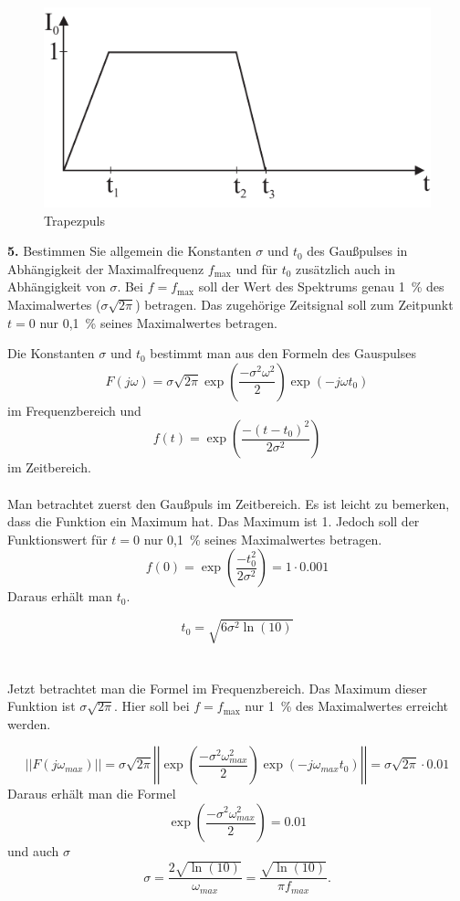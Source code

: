 \documentclass[Protokollheft.tex]{subfiles}
\begin{document}
\begin{figure}[ht]
	\centering
    \includegraphics[scale=0.9]{v7_trapez.pdf}
    \caption{Trapezpuls}\label{tra}
\end{figure}

\begin{framed}
	\noindent \textbf{5.} Bestimmen Sie allgemein die Konstanten $\sigma$ und $t_0$
des Gaußpulses in Abhängigkeit der Maximalfrequenz $f_{\text{max}}$ 
und für $t_0$ zusätzlich auch in Abhängigkeit von $\sigma$. Bei
$f=f_{\text{max}}$ soll der Wert des Spektrums genau 1~\% des
Maximalwertes ($\sigma\sqrt{2\pi}$) betragen. Das zugehörige
Zeitsignal soll zum Zeitpunkt $t=0$ nur 0,1~\% seines
Maximalwertes betragen.\label{exer:calcGaussConst}
\end{framed}
\noindent
Die Konstanten $\sigma$ und $t_0$ bestimmt man aus den Formeln des Gauspulses
$$ F(j\omega)=\sigma\sqrt{2\pi}\exp\left(\frac{-\sigma^2\omega^2}{2}\right)\exp\left(-j\omega t_0\right)$$ im Frequenzbereich und
$$
f(t)=\exp\left( \frac{-(t-t_0)^2}{2\sigma^2}         \right)
$$
im Zeitbereich.
\\
\\
Man betrachtet zuerst den Gaußpuls im Zeitbereich. Es ist leicht zu bemerken, dass die Funktion ein Maximum hat. Das Maximum ist 1. Jedoch soll der Funktionswert für $t=0$ nur 0,1~\% seines Maximalwertes betragen.
$$f(0)=\exp\left( \frac{-t_0^2}{2\sigma^2}    \right)= 1 \cdot 0.001$$
Daraus erhält man $t_0$.

$$t_0 = \sqrt{6\sigma^2\ln(10)} $$
\\
\\
Jetzt betrachtet man die Formel im Frequenzbereich. Das Maximum dieser Funktion ist $\sigma\sqrt{2\pi}$. Hier soll bei $f=f_{\text{max}}$ nur 1~\% des Maximalwertes erreicht werden.

$$ ||F(j\omega_{max})||=\sigma\sqrt{2\pi}\left|\left|\exp\left(\frac{-\sigma^2\omega_{max}^2}{2}\right)\exp\left(-j\omega_{max} t_0\right)\right|\right|=\sigma\sqrt{2\pi}\cdot 0.01$$
\noindent
Daraus erhält man die Formel
$$\exp\left(\frac{-\sigma^2\omega_{max}^2}{2}\right)=0.01$$
und auch $\sigma$
$$ \sigma =\frac{2\sqrt{\ln(10)}}{\omega_{max}}=\frac{\sqrt{\ln(10)}}{\pi f_{max}}.$$
\end{document}
